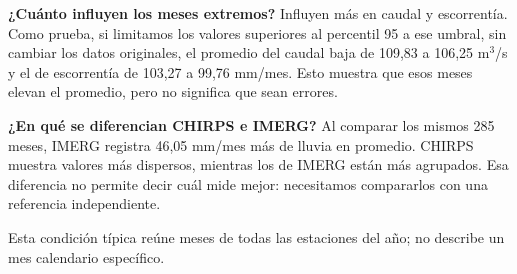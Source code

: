 \textbf{¿Cuánto influyen los meses extremos?} Influyen más en caudal y escorrentía. Como prueba, si limitamos los valores superiores al percentil 95 a ese umbral, sin cambiar los datos originales, el promedio del caudal baja de 109,83 a 106,25 m$^3$/s y el de escorrentía de 103,27 a 99,76 mm/mes. Esto muestra que esos meses elevan el promedio, pero no significa que sean errores.

\textbf{¿En qué se diferencian CHIRPS e IMERG?} Al comparar los mismos 285 meses, IMERG registra 46,05 mm/mes más de lluvia en promedio. CHIRPS muestra valores más dispersos, mientras los de IMERG están más agrupados. Esa diferencia no permite decir cuál mide mejor: necesitamos compararlos con una referencia independiente.

Esta condición típica reúne meses de todas las estaciones del año; no describe un mes calendario específico.
